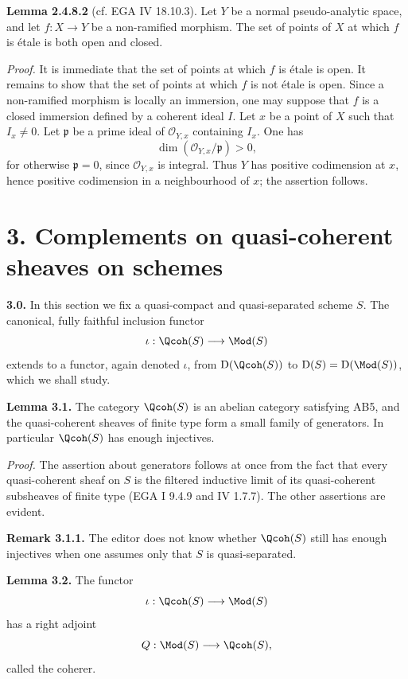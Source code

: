 \textbf{Lemma 2.4.8.2} (cf. EGA IV 18.10.3). Let $Y$ be a normal pseudo-analytic space, and let $f:X\to Y$ be a non-ramified morphism. The set of points of $X$ at which $f$ is étale is both open and closed.

\emph{Proof.} It is immediate that the set of points at which $f$ is étale is open. It remains to show that the set of points at which $f$ is not étale is open. Since a non-ramified morphism is locally an immersion, one may suppose that $f$ is a closed immersion defined by a coherent ideal $I$. Let $x$ be a point of $X$ such that $I_x\ne0$. Let $\mathfrak p$ be a prime ideal of $\mathcal O_{Y,x}$ containing $I_x$. One has
\[
 \dim(\mathcal O_{Y,x}/\mathfrak p)>0,
\]
for otherwise $\mathfrak p=0$, since $\mathcal O_{Y,x}$ is integral. Thus $Y$ has positive codimension at $x$, hence positive codimension in a neighbourhood of $x$; the assertion follows.

\section*{3. Complements on quasi-coherent sheaves on schemes}

\textbf{3.0.} In this section we fix a quasi-compact and quasi-separated scheme $S$. The canonical, fully faithful inclusion functor
\[
 \iota:\Qcoh(S)\longrightarrow\Mod(S)
\]
extends to a functor, again denoted $\iota$, from $\mathrm D(\Qcoh(S))$ to $\mathrm D(S)=\mathrm D(\Mod(S))$, which we shall study.

\textbf{Lemma 3.1.} The category $\Qcoh(S)$ is an abelian category satisfying AB5, and the quasi-coherent sheaves of finite type form a small family of generators. In particular $\Qcoh(S)$ has enough injectives.

\emph{Proof.} The assertion about generators follows at once from the fact that every quasi-coherent sheaf on $S$ is the filtered inductive limit of its quasi-coherent subsheaves of finite type (EGA I 9.4.9 and IV 1.7.7). The other assertions are evident.

\textbf{Remark 3.1.1.} The editor does not know whether $\Qcoh(S)$ still has enough injectives when one assumes only that $S$ is quasi-separated.

\textbf{Lemma 3.2.} The functor
\[
 \iota:\Qcoh(S)\longrightarrow\Mod(S)
\]
has a right adjoint
\[
 Q:\Mod(S)\longrightarrow\Qcoh(S),
\]
called the coherer.

